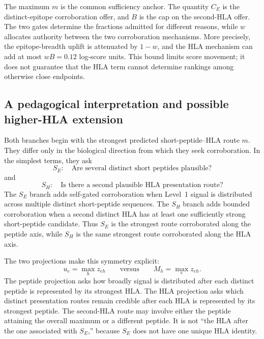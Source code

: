 \documentclass[11pt]{article}
\begin{document}
The maximum $m$ is the common sufficiency anchor. The quantity $C_E$ is the
distinct-epitope corroboration offer, and $B$ is the cap on the second-HLA
offer. The two gates determine the fractions admitted for different reasons,
while $w$ allocates authority between the two corroboration mechanisms. More
precisely, the epitope-breadth uplift is attenuated by $1-w$, and the HLA
mechanism can add at most $wB=0.12$ log-score units. This bound limits score
movement; it does not guarantee that the HLA term cannot determine rankings
among otherwise close endpoints.

\subsection{A pedagogical interpretation and possible higher-HLA extension}

Both branches begin with the strongest predicted short-peptide--HLA route
$m$. They differ only in the biological direction from which they seek
corroboration. In the simplest terms, they ask
\begin{equation}
\boxed{
S_E:\quad \text{Are several distinct short peptides plausible?}
}
\end{equation}
and
\begin{equation}
\boxed{
S_H:\quad \text{Is there a second plausible HLA presentation route?}
}
\end{equation}
The $S_E$ branch adds self-gated corroboration when Level~1 signal is
distributed across multiple distinct short-peptide sequences. The $S_H$ branch
adds bounded corroboration when a second distinct HLA has at least one
sufficiently strong short-peptide candidate. Thus $S_E$ is the strongest route
corroborated along the peptide axis, while $S_H$ is the same strongest route
corroborated along the HLA axis.

The two projections make this symmetry explicit:
\begin{equation}
u_e=\max_h z_{eh}
\qquad\text{versus}\qquad
M_h=\max_e z_{eh}.
\end{equation}
The peptide projection asks how broadly signal is distributed after each
distinct peptide is represented by its strongest HLA. The HLA projection asks
which distinct presentation routes remain credible after each HLA is
represented by its strongest peptide. The second-HLA route may involve either
the peptide attaining the overall maximum or a different peptide. It is not
``the HLA after the one associated with $S_E$,'' because $S_E$ does not have one
unique HLA identity.
\end{document}
